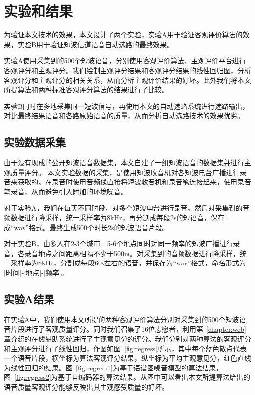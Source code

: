 \chapter{实验和结果}\label{chapter:experiments}

为验证本文技术的效果，本文设计了两个实验，实验A用于验证客观评价算法的效果，实验B用于验证短波信道语音自动选路的最终效果。

实验A使用采集到的500个短波语音，分别使用客观评价算法、主观评价平台进行客观评分和主观评分。我们绘制主观评分结果和客观评分结果的线性回归图，分析客观评分和主观评分的相关关系，从而分析主观评价结果的好坏。此外我们将本文所提算法和两种标准客观评分算法的结果进行了比较。

实验B同时在多地采集同一短波信号，再使用本文的自动选路系统进行选路输出，对比最终结果语音和各路原始语音的质量，从而分析自动选路技术的效果优劣。

\section{实验数据采集}

由于没有现成的公开短波语音数据集，本文自建了一组短波语音的数据集并进行主观质量评分。
本文实验数据的采集，是使用短波收音机对各短波电台广播进行录音来获取的。在录音时使用音频线直接将短波收音机和录音笔连接起来，使用录音笔录音，从而避免引入附加的环境噪音。

对于实验A，我们在每天不同时段，对多个短波电台进行录音。然后对采集到的音频数据进行降采样，统一采样率为8kHz，再分割成每段2s的短语音，保存成“wav”格式。最终生成500个时长2s的短波语音片段。

对于实验B，由多人在2-3个城市，5-6个地点同时对同一频率的短波广播进行录音，各录音地点之间距离相隔不少于500m。对采集到的音频数据进行降采样，统一采样率为8kHz，分割成每段60s左右的语音，并保存为“wav”格式，命名形式为[时间]-[地点]-[频率]。

\section{实验A结果}

在实验A中，我们使用本文所提的两种客观评价算法分别对采集到的500个短波语音片段进行了客观质量评分。同时我们召集了16位志愿者，利用第~\ref{chapter:web}章介绍的在线辅助系统进行了主观意见分的评分。我们分别对两种算法的客观评分和主观评分进行了线性回归，作图如图~\ref{fig:regress}所示，其中每个蓝色散点代表一个语音片段，横坐标为算法客观评分结果，纵坐标为平均主观意见分，红色直线为线性回归的结果。图~\ref{fig:regress1}为基于语谱图噪音模型的算法结果，图~\ref{fig:regress2}为基于自编码器的算法结果。从图中可以看出本文所提算法给出的语音质量客观评分能够反映出其主观感受质量的好坏。

